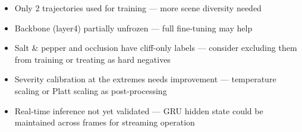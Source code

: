 \documentclass[11pt, a4paper]{article}
\begin{document}
\begin{itemize}
    \item Only 2 trajectories used for training --- more scene diversity needed
    \item Backbone (layer4) partially unfrozen --- full fine-tuning may help
    \item Salt \& pepper and occlusion have cliff-only labels --- consider
          excluding them from training or treating as hard negatives
    \item Severity calibration at the extremes needs improvement ---
          temperature scaling or Platt scaling as post-processing
    \item Real-time inference not yet validated --- GRU hidden state could be
          maintained across frames for streaming operation
\end{itemize}
\end{document}

